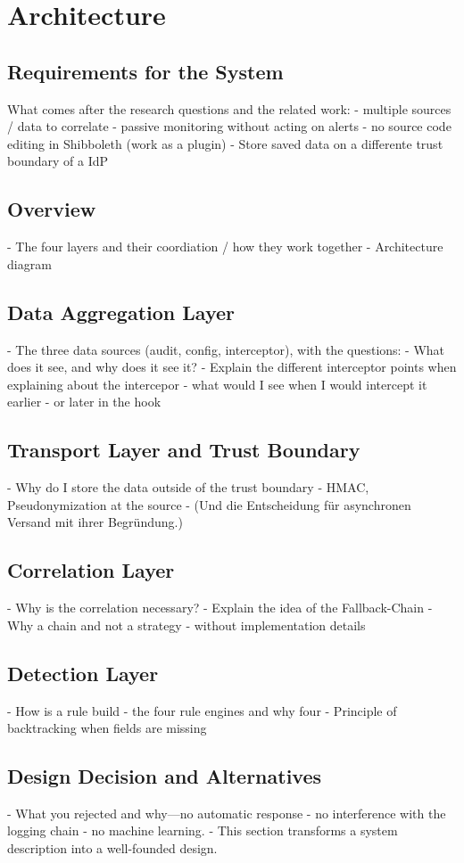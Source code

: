 \documentclass[../main.tex]{subfiles}
\begin{document}
\chapter{Architecture}\label{ch:architecture}

\section{Requirements for the System}\label{sec:requirements}
What comes after the research questions and the related work:
- multiple sources / data to correlate
- passive monitoring without acting on alerts
- no source code editing in Shibboleth (work as a plugin)
- Store saved data on a differente trust boundary of a IdP

\section{Overview}\label{sec:overview}
- The four layers and their coordiation / how they work together
- Architecture diagram

\section{Data Aggregation Layer}\label{sec:dataaggregation}
- The three data sources (audit, config, interceptor), with the questions: 
    - What does it see, and why does it see it? 
    - Explain the different interceptor points when explaining about the intercepor
        - what would I see when I would intercept it earlier
        - or later in the hook

\section{Transport Layer and Trust Boundary}\label{sec:trust}
- Why do I store the data outside of the trust boundary
- HMAC, Pseudonymization at the source
- (Und die Entscheidung für asynchronen Versand mit ihrer Begründung.)

\section{Correlation Layer}\label{sec:correlation}
- Why is the correlation necessary?
- Explain the idea of the Fallback-Chain
- Why a chain and not a strategy
- without implementation details

\section{Detection Layer}\label{sec:detection}
- How is a rule build
- the four rule engines and why four
- Principle of backtracking when fields are missing

\section{Design Decision and Alternatives}\label{sec:design}
- What you rejected and why—no automatic response
- no interference with the logging chain
- no machine learning.
- This section transforms a system description into a well-founded design.
\end{document}
